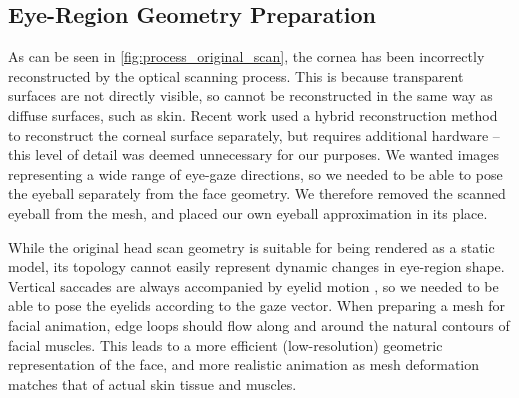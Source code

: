 \subsection{Eye-Region Geometry Preparation}

As can be seen in \autoref{fig:process_original_scan}, the cornea has been incorrectly reconstructed by the optical scanning process.
This is because transparent surfaces are not directly visible, so cannot be reconstructed in the same way as diffuse surfaces, such as skin.
Recent work used a hybrid reconstruction method to reconstruct the corneal surface separately, but requires additional hardware \cite{berard2014highquality} -- this level of detail was deemed unnecessary for our purposes.
We wanted images representing a wide range of eye-gaze directions, so we needed to be able to pose the eyeball separately from the face geometry.
We therefore removed the scanned eyeball from the mesh, and placed our own eyeball approximation in its place.

While the original head scan geometry is suitable for being rendered as a static model, its topology cannot easily represent dynamic changes in eye-region shape.
Vertical saccades are always accompanied by eyelid motion \cite{liversedge2011oxford}, so we needed to be able to pose the eyelids according to the gaze vector.
When preparing a mesh for facial animation, edge loops should flow along and around the natural contours of facial muscles.
This leads to a more efficient (low-resolution) geometric representation of the face, and more realistic animation as mesh deformation matches that of actual skin tissue and muscles.


